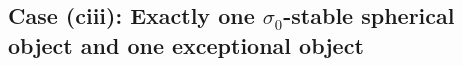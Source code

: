 \documentclass[leqno,11pt]{amsart}
\newtheorem{Cor}[Thm]{Corollary}
\theoremstyle{definition}
\def\CC{\ensuremath{\mathcal C}}
\begin{document}


\subsection{Case (ciii): Exactly one $\sigma_0$-stable spherical object and one exceptional object}
\end{document}

